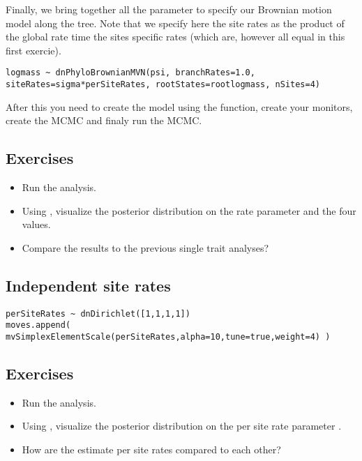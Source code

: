 Finally, we bring together all the parameter to specify our Brownian motion model along the tree. Note that we specify here the site rates as the product of the global rate  time the sites specific rates (which are, however all equal in this first exercie).
{\tt \small \begin{snugshade*}
\begin{lstlisting}
logmass ~ dnPhyloBrownianMVN(psi, branchRates=1.0, siteRates=sigma*perSiteRates, rootStates=rootlogmass, nSites=4)
\end{lstlisting}
\end{snugshade*}}

After this you need to create the model using the  function, create your monitors, create the MCMC and finaly run the MCMC.


\subsection*{Exercises}

\begin{itemize}
\item
Run the analysis.
\item
Using , visualize the posterior distribution on the rate parameter  and the four  values.
\item 
Compare the results to the previous single trait analyses?
\end{itemize}

\vspace{5cm}



\subsection{Independent site rates}

{\tt \small \begin{snugshade*}
\begin{lstlisting}
perSiteRates ~ dnDirichlet([1,1,1,1])
moves.append( mvSimplexElementScale(perSiteRates,alpha=10,tune=true,weight=4) )
\end{lstlisting}
\end{snugshade*}}


\subsection*{Exercises}

\begin{itemize}
\item
Run the analysis.
\item
Using , visualize the posterior distribution on the per site rate parameter .
\item 
How are the estimate per site rates compared to each other?
\end{itemize}

